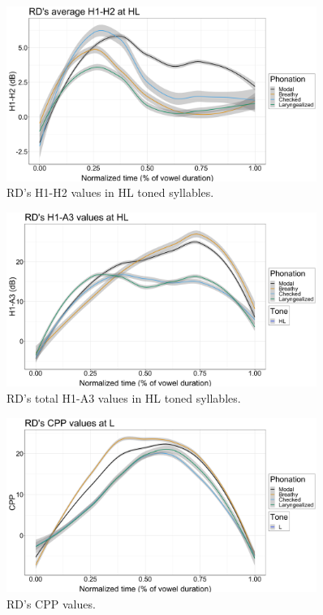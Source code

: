 \documentclass[12pt, letterpaper]{article}
\begin{document}
\begin{figure}[!ht]
	\includegraphics[width=0.9\textwidth]{../RDh1h2_line_HL.png}
	\caption{RD's H1-H2 values in HL toned syllables.}
	\label{fig:RDh1h2} 
\end{figure}


\begin{figure}[!ht]
	\includegraphics[width=0.9\textwidth]{../RDH1A3_HL.png}
	\caption{RD's total H1-A3 values in HL toned syllables. }
	\label{fig:RDh1a3} 
\end{figure}

	
\begin{figure}[!ht]
	\includegraphics[width=0.9\textwidth]{../RDCPP_lineL.png}
	\caption{RD's CPP values.}
	\label{fig:RDCPP} 
\end{figure}	
\end{document}
